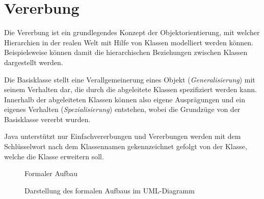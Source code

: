 \documentclass{tuda-pub}
\begin{document}
  \section{Vererbung}
  \label{sec:Vererbung}

  Die Vererbung ist ein grundlegendes Konzept der Objektorientierung, mit welcher Hierarchien in
  der realen Welt mit Hilfe von Klassen modelliert werden können. Beispielsweise können damit die
  hierarchischen Beziehungen zwischen Klassen dargestellt werden.

  \br

  Die Basisklasse stellt eine Verallgemeinerung eines Objekt (\textit{Generalisierung}) mit
  seinem Verhalten dar, die durch die abgeleitete Klassen spezifiziert werden kann. Innerhalb der
  abgeleiteten Klassen können also eigene Ausprägungen und ein eigenes Verhalten
  (\textit{Spezialisierung}) entstehen, wobei die Grundzüge von der Basisklasse vererbt wurden.

  \br

  Java unterstützt nur Einfachvererbungen und Vererbungen werden mit dem Schlüsselwort
   nach dem Klassennamen gekennzeichnet gefolgt von der Klasse, welche die
  Klasse erweitern soll.

  \begin{figure}[h]
    \centering
    \begin{minipage}[t]{.425\linewidth}
      
    \end{minipage}
    \hfill\vline\hfill
    \begin{minipage}[t]{.55\linewidth}
      
    \end{minipage}
    \caption{Formaler Aufbau}
  \end{figure}

  \begin{figure}[h]
    \centering
    \caption{Darstellung des formalen Aufbaus im UML-Diagramm}
  \end{figure}
\end{document}
